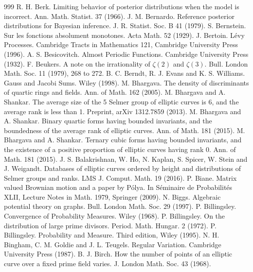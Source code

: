 \begin{thebibliography}{999}
 R. H. Berk. Limiting behavior of posterior distributions when the model is incorrect. Ann. Math. Statist. 37 (1966).
 J. M. Bernardo. Reference posterior distributions for Bayesian inference. J. R. Statist. Soc. B 41 (1979).
 S. Bernstein. Sur les fonctions absolument monotones. Acta Math. 52 (1929).
 J. Bertoin. L\'evy Processes. Cambridge Tracts in Mathematics 121, Cambridge University Press (1996).
 A. S. Besicovitch. Almost Periodic Functions. Cambridge University Press (1932).
 F. Beukers. A note on the irrationality of $\zeta(2)$ and $\zeta(3)$. Bull. London Math. Soc. 11 (1979), 268 to 272.
 B. C. Berndt, R. J. Evans and K. S. Williams. Gauss and Jacobi Sums. Wiley (1998).
 M. Bhargava. The density of discriminants of quartic rings and fields. Ann. of Math. 162 (2005).
 M. Bhargava and A. Shankar. The average size of the 5 Selmer group of elliptic curves is 6, and the average rank is less than 1. Preprint, arXiv 1312.7859 (2013).
 M. Bhargava and A. Shankar. Binary quartic forms having bounded invariants, and the boundedness of the average rank of elliptic curves. Ann. of Math. 181 (2015).
 M. Bhargava and A. Shankar. Ternary cubic forms having bounded invariants, and the existence of a positive proportion of elliptic curves having rank 0. Ann. of Math. 181 (2015).
 J. S. Balakrishnan, W. Ho, N. Kaplan, S. Spicer, W. Stein and J. Weigandt. Databases of elliptic curves ordered by height and distributions of Selmer groups and ranks. LMS J. Comput. Math. 19 (2016).
 P. Biane. Matrix valued Brownian motion and a paper by P\'olya. In S\'eminaire de Probabilit\'es XLII, Lecture Notes in Math. 1979, Springer (2009).
 N. Biggs. Algebraic potential theory on graphs. Bull. London Math. Soc. 29 (1997).
 P. Billingsley. Convergence of Probability Measures. Wiley (1968).
 P. Billingsley. On the distribution of large prime divisors. Period. Math. Hungar. 2 (1972).
 P. Billingsley. Probability and Measure. Third edition, Wiley (1995).
 N. H. Bingham, C. M. Goldie and J. L. Teugels. Regular Variation. Cambridge University Press (1987).
 B. J. Birch. How the number of points of an elliptic curve over a fixed prime field varies. J. London Math. Soc. 43 (1968).

\end{thebibliography}
